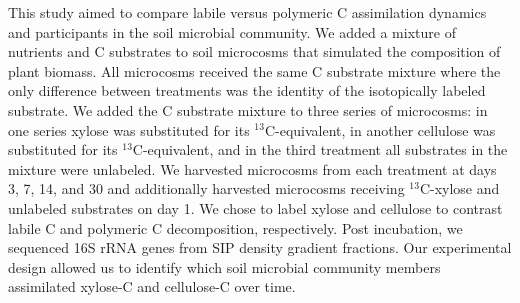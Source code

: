 This study aimed to compare labile versus polymeric C assimilation dynamics and
participants in the soil microbial community. We added a mixture of nutrients
and C substrates to soil microcosms that simulated the composition of plant
biomass. All microcosms received the same C substrate mixture where the only
difference between treatments was the identity of the isotopically labeled
substrate. We added the C substrate mixture to three series of
microcosms: in one series xylose was substituted for its $^{13}$C-equivalent,
in another cellulose was substituted for its $^{13}$C-equivalent, and in the
third treatment all substrates in the mixture were unlabeled. We harvested
microcosms from each treatment at days 3, 7, 14, and 30 and additionally
harvested microcosms receiving $^{13}$C-xylose and unlabeled substrates on day
1. We chose to label xylose and cellulose to contrast labile C and polymeric
C decomposition, respectively. Post incubation, we sequenced 16S rRNA genes
from SIP density gradient fractions. Our experimental design allowed us to
identify which soil microbial community members assimilated xylose-C
and cellulose-C over time.
